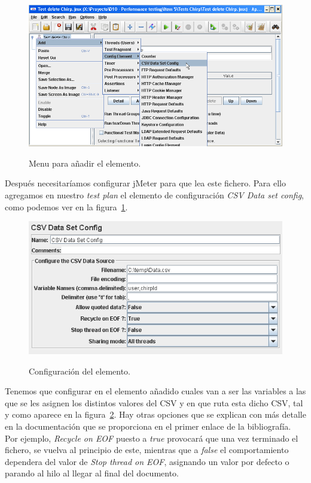 \documentclass[a4paper]{article}
\begin{document}
\begin{figure}
\caption{Menu para añadir el elemento.}
\includegraphics[width=\linewidth]{menu_csv}
\label{fig:menu_csv}
\end{figure}

Después necesitaríamos configurar jMeter para que lea este fichero. Para ello agregamos en nuestro \textit{test plan} el elemento de configuración \textit{CSV Data set config}, como podemos ver en la figura~\ref{fig:menu_csv}.

\begin{figure}
\caption{Configuración del elemento.}
\includegraphics[width=\linewidth]{Config1}
\label{fig:Config1}
\end{figure}

Tenemos que configurar en el elemento añadido cuales van a ser las variables a las que se les asignen los distintos valores del CSV y en que ruta esta dicho CSV, tal y como aparece en la figura~\ref{fig:Config1}. Hay otras opciones que se explican con más detalle en la documentación que se proporciona en el primer enlace de la bibliografía. Por ejemplo, \textit{Recycle on EOF} puesto a \textit{true} provocará que una vez terminado el fichero, se vuelva al principio de este, mientras que a \textit{false} el comportamiento dependera del valor de \textit{Stop thread on EOF}, asignando un valor por defecto o parando al hilo al llegar al final del documento.
\end{document}
